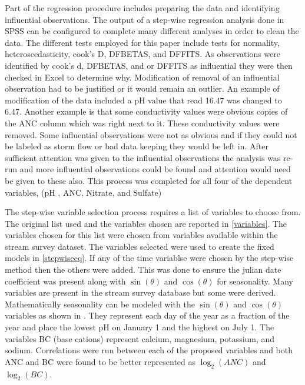  Part of the regression procedure includes preparing the data and  identifying influential observations.  The output of a step-wise regression analysis done in SPSS can be configured to complete many different analyses in order to clean the data.  The different tests employed for this paper include tests for normality, heteroscedasticity, cook's D, DFBETAS, and DFFITS.  As observations were identified by cook's d, DFBETAS, and or DFFITS as influential they were then checked in Excel to determine why.  Modification of removal of an influential observation had to be justified or it would remain an outlier.  An example of modification of the data included a pH value that read 16.47 was changed to 6.47.  Another example is that some conductivity values were obvious copies of the ANC column which was right next to it.  These conductivity values were removed.   Some influential observations were not as obvious and if they could not be labeled as storm flow or bad data keeping they would be left in.  After sufficient attention was given to the influential observations the analysis was re-run and more influential observations could be found and attention would need be given to these also.  This process was completed for all four of the dependent variables, (pH , ANC, Nitrate, and Sulfate)
 
 The step-wise variable selection process requires a list of variables to choose from.  The original list used and the variables chosen are reported in \autoref{variables}.  The variables chosen for this list were chosen from variables available within the stream survey dataset.   The variables selected were used to create the fixed models in \autoref{stepwiseeq}.  If any of the time variablse were chosen by the step-wise method then the others were added.  This was done to ensure the julian date coefficient was present along with $\sin(\theta)$ and $\cos(\theta)$ for seasonality. %
 Many variables are present in the stream survey database but some were derived.  Mathematically seasonality can be modeled with the $\sin(\theta)$ and $\cos(\theta)$ variables as shown in \citet{helsel1992statistical}.  They represent each day of the year as a fraction of the year and place the lowest pH on January 1 and the highest on July 1.  The variables BC (base cations) represent calcium, magnesium, potassium, and sodium.  Correlations were run between each of the proposed variables  and both ANC and BC were found to be better represented as $\log_2(ANC)$ and $\log_2(BC)$.
 

